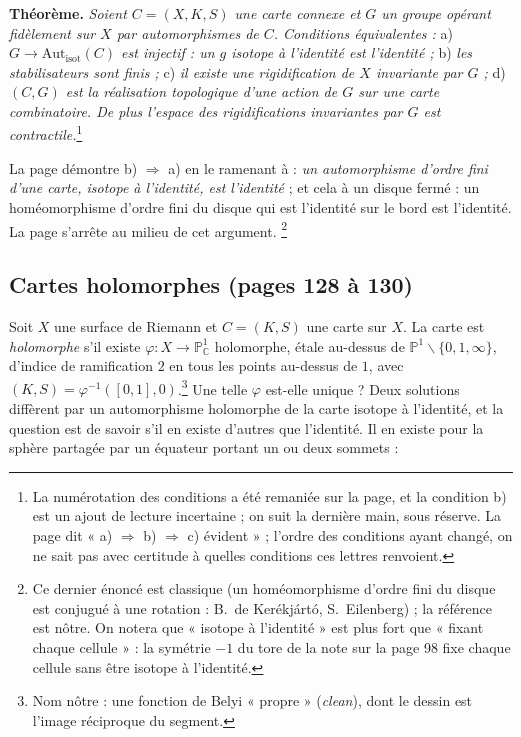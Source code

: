 \documentclass[11pt,a4paper]{article}
\begin{document}
\textbf{Théorème.} \emph{Soient $C = (X, K, S)$ une carte connexe et $G$ un groupe
opérant fidèlement sur $X$ par automorphismes de $C$. Conditions
équivalentes :} a) \emph{$G \to \mathrm{Aut}_{\mathrm{isot}}(C)$ est injectif : un
$g$ isotope à l'identité est l'identité ;} b) \emph{les stabilisateurs sont
finis ;} c) \emph{il existe une rigidification de $X$ invariante par $G$ ;} d)
\emph{$(C, G)$ est la réalisation topologique d'une action de $G$ sur une carte
combinatoire. De plus l'espace des rigidifications invariantes par $G$ est
contractile.}\footnote{La numérotation des conditions a été remaniée sur la
page, et la condition b) est un ajout de lecture incertaine ; on suit la
dernière main, sous réserve. La page dit « a) $\Rightarrow$ b) $\Rightarrow$ c)
évident » ; l'ordre des conditions ayant changé, on ne sait pas avec certitude
à quelles conditions ces lettres renvoient.}

La page démontre b) $\Rightarrow$ a) en le ramenant à : \emph{un automorphisme
d'ordre fini d'une carte, isotope à l'identité, est l'identité} ; et cela à un
disque fermé : un homéomorphisme d'ordre fini du disque qui est l'identité sur
le bord est l'identité. La page s'arrête au milieu de cet argument.%
\footnote{Ce dernier énoncé est classique (un homéomorphisme d'ordre fini du
disque est conjugué à une rotation : B.~de Kerékjártó, S.~Eilenberg) ; la
référence est nôtre. On notera que « isotope à l'identité » est plus fort que
« fixant chaque cellule » : la symétrie $-1$ du tore de la note sur la page 98
fixe chaque cellule sans être isotope à l'identité.}

\subsection*{Cartes holomorphes (pages 128 à 130)}

Soit $X$ une surface de Riemann et $C = (K, S)$ une carte sur $X$. La carte
est \emph{holomorphe} s'il existe $\varphi : X \to \mathbb{P}^{1}_{\mathbb{C}}$
holomorphe, étale au-dessus de $\mathbb{P}^{1} \smallsetminus \{0, 1, \infty\}$,
d'indice de ramification $2$ en tous les points au-dessus de $1$, avec $(K, S) =
\varphi^{-1}([0, 1], 0)$.\footnote{Nom nôtre : une fonction de Belyi « propre »
(\emph{clean}), dont le dessin est l'image réciproque du segment.} Une telle
$\varphi$ est-elle unique ? Deux solutions diffèrent par un automorphisme
holomorphe de la carte isotope à l'identité, et la question est de savoir s'il
en existe d'autres que l'identité. Il en existe pour la sphère partagée par un
équateur portant un ou deux sommets :
\end{document}
